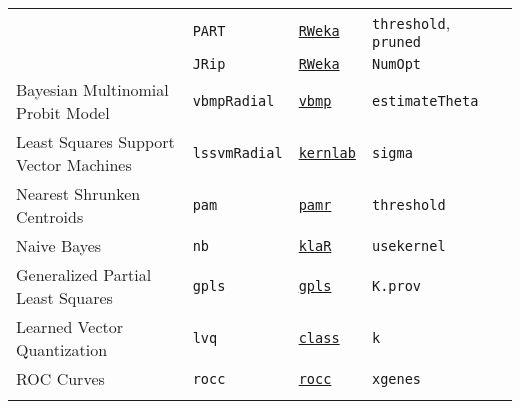 \documentclass[12pt]{article}
\begin{document}
\begin{landscape}
\begin{longtable}{lllll}
       &
         \texttt{PART} & 
           {\tt \href{http://cran.r-project.org/web/packages/RWeka/index.html}{RWeka}}   & 
            \texttt{threshold}, \texttt{pruned}   \\  
            
        &
         \texttt{JRip} & 
           {\tt \href{http://cran.r-project.org/web/packages/RWeka/index.html}{RWeka}}    & 
            \texttt{NumOpt}   \\

\rowcolor[rgb]{.95, .95, .95}                     
      Bayesian Multinomial Probit Model  
      & \texttt{vbmpRadial} 
      &  {\tt \href{http://cran.r-project.org/web/packages/vbmp/index.html}{vbmp}} 
      & \texttt{estimateTheta} \\
      
      Least Squares Support Vector Machines &
         \texttt{lssvmRadial} & 
             {\tt \href{http://cran.r-project.org/web/packages/kernlab/index.html}{kernlab}}      & 
            \texttt{sigma} \\             
       
\rowcolor[rgb]{.95, .95, .95}                
      Nearest Shrunken Centroids&
         \texttt{pam} & 
             {\tt \href{http://cran.r-project.org/web/packages/pamr/index.html}{pamr}}        & 
            \texttt{threshold} \\  
       
      Naive Bayes &
         \texttt{nb} & 
            {\tt \href{http://cran.r-project.org/web/packages/klaR/index.html}{klaR}}     & 
            \texttt{usekernel} \\
        
\rowcolor[rgb]{.95, .95, .95}                 
      Generalized Partial Least Squares&
         \texttt{gpls} & 
             {\tt \href{http://cran.r-project.org/web/packages/gpls/index.html}{gpls}}      & 
            \texttt{K.prov} \\
      
      Learned Vector  Quantization&
         \texttt{lvq} & 
             {\tt \href{http://cran.r-project.org/web/packages/class/index.html}{class}}       &          
            \texttt{k} \\  
     
\rowcolor[rgb]{.95, .95, .95}              
      ROC Curves &
         \texttt{rocc} & 
             {\tt \href{http://cran.r-project.org/web/packages/rocc/index.html}{rocc}}    &          
            \texttt{xgenes} \\                 
\label{label-name}
\end{longtable}
\end{landscape}
\pagestyle{fancy}
\end{document}
